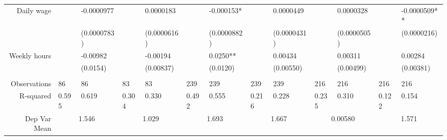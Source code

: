 \begin{tabular}{rrrrrrrrrrrrr}
Daily wage & \multicolumn{1}{l}{} & \multicolumn{1}{l}{-0.0000977} & \multicolumn{1}{l}{} & \multicolumn{1}{l}{0.0000183} & \multicolumn{1}{l}{} & \multicolumn{1}{l}{-0.000153*} & \multicolumn{1}{l}{} & \multicolumn{1}{l}{0.0000449} & \multicolumn{1}{l}{} & \multicolumn{1}{l}{0.0000328} & \multicolumn{1}{l}{} & \multicolumn{1}{l}{-0.0000509**} \\
      & \multicolumn{1}{l}{} & \multicolumn{1}{l}{(0.0000783)} & \multicolumn{1}{l}{} & \multicolumn{1}{l}{(0.0000616)} & \multicolumn{1}{l}{} & \multicolumn{1}{l}{(0.0000882)} & \multicolumn{1}{l}{} & \multicolumn{1}{l}{(0.0000431)} & \multicolumn{1}{l}{} & \multicolumn{1}{l}{(0.0000505)} & \multicolumn{1}{l}{} & \multicolumn{1}{l}{(0.0000216)} \\
Weekly hours & \multicolumn{1}{l}{} & \multicolumn{1}{l}{-0.00982} & \multicolumn{1}{l}{} & \multicolumn{1}{l}{-0.00194} & \multicolumn{1}{l}{} & \multicolumn{1}{l}{0.0250**} & \multicolumn{1}{l}{} & \multicolumn{1}{l}{0.00434} & \multicolumn{1}{l}{} & \multicolumn{1}{l}{0.00311} & \multicolumn{1}{l}{} & \multicolumn{1}{l}{0.00284} \\
      & \multicolumn{1}{l}{} & \multicolumn{1}{l}{(0.0154)} & \multicolumn{1}{l}{} & \multicolumn{1}{l}{(0.00837)} & \multicolumn{1}{l}{} & \multicolumn{1}{l}{(0.0120)} & \multicolumn{1}{l}{} & \multicolumn{1}{l}{(0.00550)} & \multicolumn{1}{l}{} & \multicolumn{1}{l}{(0.00499)} & \multicolumn{1}{l}{} & \multicolumn{1}{l}{(0.00381)} \\
      & \multicolumn{1}{l}{} & \multicolumn{1}{l}{} & \multicolumn{1}{l}{} & \multicolumn{1}{l}{} & \multicolumn{1}{l}{} & \multicolumn{1}{l}{} & \multicolumn{1}{l}{} & \multicolumn{1}{l}{} & \multicolumn{1}{l}{} & \multicolumn{1}{l}{} & \multicolumn{1}{l}{} & \multicolumn{1}{l}{} \\
       \midrule
Observations & \multicolumn{1}{l}{86} & \multicolumn{1}{l}{86} & \multicolumn{1}{l}{83} & \multicolumn{1}{l}{83} & \multicolumn{1}{l}{239} & \multicolumn{1}{l}{239} & \multicolumn{1}{l}{239} & \multicolumn{1}{l}{239} & \multicolumn{1}{l}{216} & \multicolumn{1}{l}{216} & \multicolumn{1}{l}{216} & \multicolumn{1}{l}{216} \\
R-squared & \multicolumn{1}{l}{0.595} & \multicolumn{1}{l}{0.619} & \multicolumn{1}{l}{0.304} & \multicolumn{1}{l}{0.330} & \multicolumn{1}{l}{0.492} & \multicolumn{1}{l}{0.555} & \multicolumn{1}{l}{0.216} & \multicolumn{1}{l}{0.228} & \multicolumn{1}{l}{0.235} & \multicolumn{1}{l}{0.310} & \multicolumn{1}{l}{0.122} & \multicolumn{1}{l}{0.154} \\
Dep Var Mean & \multicolumn{2}{c}{1.546} & \multicolumn{2}{c}{1.029} & \multicolumn{2}{c}{1.693} & \multicolumn{2}{c}{1.667} & \multicolumn{2}{c}{0.00580} & \multicolumn{2}{c}{1.571} \\
\bottomrule
\end{tabular}%
